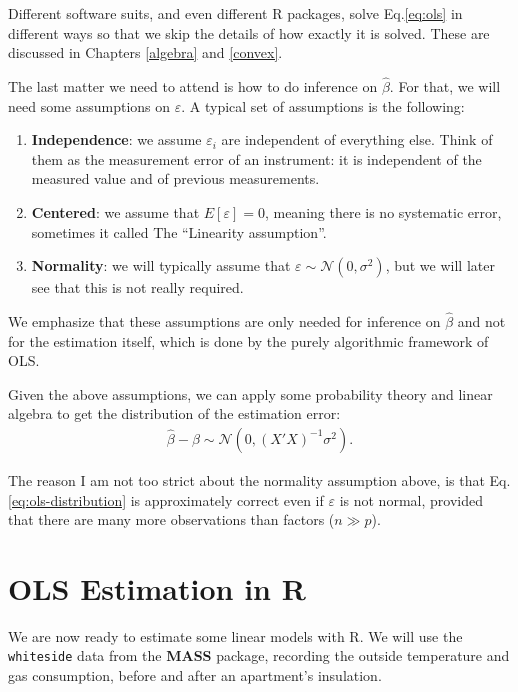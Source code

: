 \documentclass[]{book}
\providecommand{\tightlist}{%
  \setlength{\itemsep}{0pt}\setlength{\parskip}{0pt}}
\theoremstyle{definition}
\theoremstyle{definition}
\theoremstyle{definition}
\theoremstyle{remark}
\begin{document}
Different software suits, and even different R packages, solve Eq.\eqref{eq:ols} in different ways so that we skip the details of how exactly it is solved.
These are discussed in Chapters \ref{algebra} and \ref{convex}.

The last matter we need to attend is how to do inference on \(\hat \beta\).
For that, we will need some assumptions on \(\varepsilon\).
A typical set of assumptions is the following:

\begin{enumerate}
\def\labelenumi{\arabic{enumi}.}
\tightlist
\item
  \textbf{Independence}: we assume \(\varepsilon_i\) are independent of everything else.
  Think of them as the measurement error of an instrument: it is independent of the measured value and of previous measurements.
\item
  \textbf{Centered}: we assume that \(E[\varepsilon]=0\), meaning there is no systematic error, sometimes it called The ``Linearity assumption''.
\item
  \textbf{Normality}: we will typically assume that \(\varepsilon \sim \mathcal{N}(0,\sigma^2)\), but we will later see that this is not really required.
\end{enumerate}

We emphasize that these assumptions are only needed for inference on \(\hat \beta\) and not for the estimation itself, which is done by the purely algorithmic framework of OLS.

Given the above assumptions, we can apply some probability theory and linear algebra to get the distribution of the estimation error:
\begin{align}
  \hat \beta - \beta \sim \mathcal{N}(0, (X'X)^{-1} \sigma^2).
  \label{eq:ols-distribution}
\end{align}

The reason I am not too strict about the normality assumption above, is that Eq.\eqref{eq:ols-distribution} is approximately correct even if \(\varepsilon\) is not normal, provided that there are many more observations than factors (\(n \gg p\)).

\hypertarget{ols-estimation-in-r}{%
\section{OLS Estimation in R}\label{ols-estimation-in-r}}

We are now ready to estimate some linear models with R.
We will use the \texttt{whiteside} data from the \textbf{MASS} package, recording the outside temperature and gas consumption, before and after an apartment's insulation.
\end{document}

